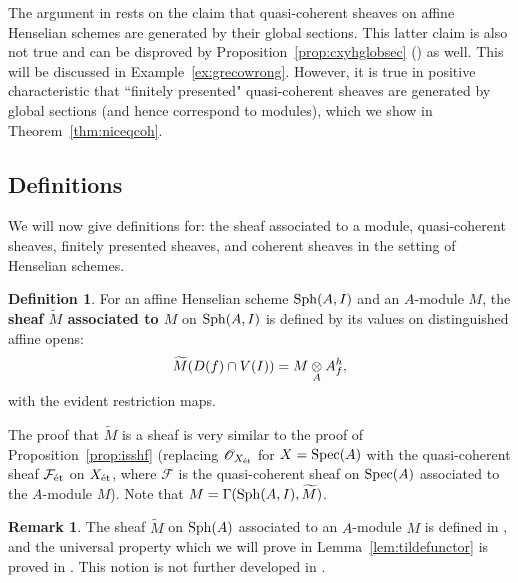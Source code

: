 \documentclass[12pt]{article}
\renewcommand{\O}{\mathscr{O}}
\newcommand{\F}{\mathcal{F}}
\newcommand{\spec}{{\rm Spec}}
\newcommand{\sph}{{\rm Sph}}
\newcommand{\et}{{\rm\acute{e}t}}
\theoremstyle{definition}
\newtheorem{definition}[theorem]{Definition}
\newtheorem{remark}[theorem]{Remark}
\numberwithin{equation}{subsection}
\begin{document}
The argument in \cite{greco81} rests on the claim that quasi-coherent sheaves on affine Henselian schemes are generated by their global sections. This latter claim is also not true and can be disproved by Proposition~\ref{prop:cxyhglobsec} (\cite{nothmbblog}) as well. This will be discussed in Example~\ref{ex:grecowrong}. However, it is true in positive characteristic that ``finitely presented" quasi-coherent sheaves are generated by global sections (and hence correspond to modules), which we show in Theorem~\ref{thm:niceqcoh}.

\subsection{Definitions}

We will now give definitions for: the sheaf associated to a module, quasi-coherent sheaves, finitely presented sheaves, and coherent sheaves in the setting of Henselian schemes.

\begin{definition}\label{def:tildeshf} For an affine Henselian scheme $\sph(A,I)$ and an $A$-module $M$, the {\bf sheaf $\widetilde{M}$ associated to $M$} on $\sph(A,I)$ is defined by its values on distinguished affine opens: $$\widetilde{M}(D(f) \cap V(I)) = M \tens_A A_f^h,$$ with the evident restriction maps.

The proof that $\widetilde{M}$ is a sheaf is very similar to the proof of Proposition~\ref{prop:isshf} (replacing $\O_{X_{\et}}$ for $X=\spec(A)$ with the quasi-coherent sheaf $\F_{\et}$ on $X_{\et}$, where $\F$ is the quasi-coherent sheaf on $\spec(A)$ associated to the $A$-module $M$). Note that $M=\Gamma(\sph(A,I),\widetilde{M})$.
\end{definition}
\begin{remark}\label{rmk:kprqcoh} The sheaf $\widetilde{M}$ on $\sph(A)$ associated to an $A$-module $M$ is defined in \cite[Section 7.1.3]{kpr}, and the universal property which we will prove in Lemma~\ref{lem:tildefunctor} is proved in \cite[Satz 7.1.3.1]{kpr}. This notion is not further developed in \cite{kpr}.
\end{remark}
\end{document}
